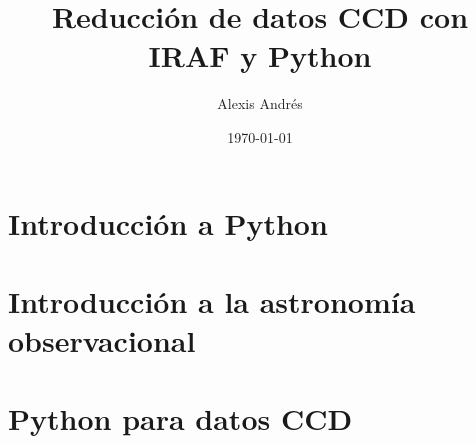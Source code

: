 \documentclass[11pt, letterpaper]{report}
\title{\bf\Huge Reducción de datos CCD con IRAF y Python}
\author{Alexis Andrés}
\date{\today}
\begin{document}
\renewcommand*\thepart{\arabic{part}}
\renewcommand{\partname}{Unidad}
\renewcommand{\chaptername}{Clase}
\renewcommand{\tablename}{Tabla}

\maketitle

\tableofcontents

\part{Introducción a Python}





\part{Introducción a la astronomía observacional}





\part{Python para datos CCD}




\end{document}

